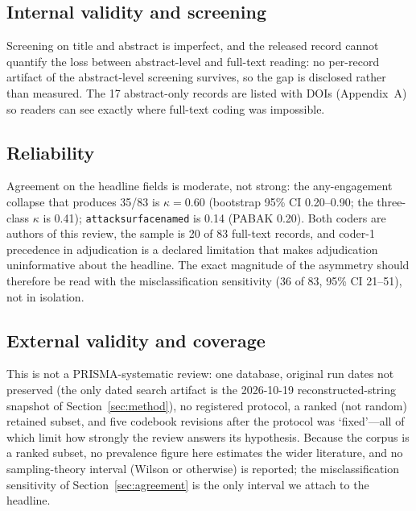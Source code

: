 \documentclass[preprint,12pt]{elsarticle}
\renewcommand{\_}{\plainunderscore\allowbreak}
\begin{document}
\subsection{Internal validity and screening}
Screening on title and abstract is imperfect, and the released record cannot quantify the
loss between abstract-level and full-text reading: no per-record artifact of the
abstract-level screening survives, so the gap is disclosed rather than measured. The
17 abstract-only records are listed with DOIs (Appendix~A) so readers can see exactly
where full-text coding was impossible.

\subsection{Reliability}
Agreement on the headline fields is moderate, not strong: the any-engagement collapse that
produces 35/83 is $\kappa = 0.60$ (bootstrap 95\% CI 0.20--0.90; the three-class $\kappa$ is
0.41); \texttt{attack\_surface\_named} is 0.14 (PABAK 0.20). Both coders are authors of this
review, the sample is 20 of 83 full-text records, and coder-1 precedence in adjudication is a
declared limitation that makes adjudication uninformative about the headline. The exact
magnitude of the asymmetry should therefore be read with the misclassification sensitivity
(36 of 83, 95\% CI 21--51), not in isolation.

\subsection{External validity and coverage}
This is not a PRISMA-systematic review: one database, original run dates not preserved (the
only dated search artifact is the 2026-10-19 reconstructed-string snapshot of
Section~\ref{sec:method}), no registered protocol, a ranked (not random) retained subset, and
five codebook revisions after the protocol was `fixed'---all of which limit how strongly the
review answers its hypothesis.
Because the corpus is a ranked subset, no prevalence figure here estimates the wider
literature, and no sampling-theory interval (Wilson or otherwise) is reported; the
misclassification sensitivity of Section~\ref{sec:agreement} is the only interval we attach
to the headline.
\end{document}
